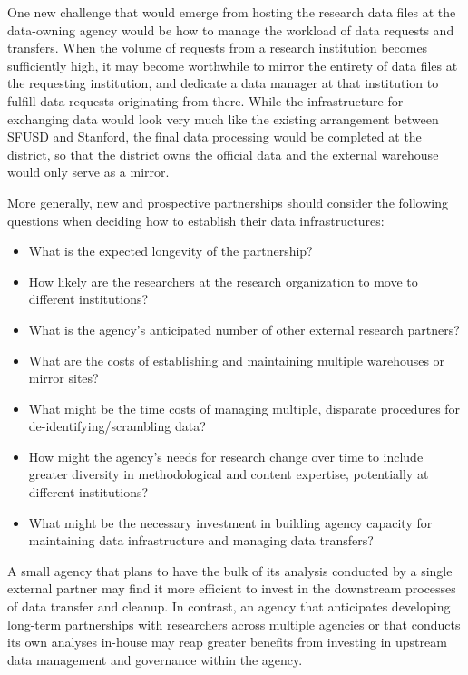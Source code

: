 \documentclass[
]{book}
\providecommand{\tightlist}{%
  \setlength{\itemsep}{0pt}\setlength{\parskip}{0pt}}
\begin{document}
One new challenge that would emerge from hosting the research data files at the data-owning agency would be how to manage the workload of data requests and transfers. When the volume of requests from a research institution becomes sufficiently high, it may become worthwhile to mirror the entirety of data files at the requesting institution, and dedicate a data manager at that institution to fulfill data requests originating from there. While the infrastructure for exchanging data would look very much like the existing arrangement between SFUSD and Stanford, the final data processing would be completed at the district, so that the district owns the official data and the external warehouse would only serve as a mirror.

More generally, new and prospective partnerships should consider the following questions when deciding how to establish their data infrastructures:

\begin{itemize}
\tightlist
\item
  What is the expected longevity of the partnership?
\item
  How likely are the researchers at the research organization to move to different institutions?
\item
  What is the agency's anticipated number of other external research partners?
\item
  What are the costs of establishing and maintaining multiple warehouses or mirror sites?
\item
  What might be the time costs of managing multiple, disparate procedures for de-identifying/scrambling data?
\item
  How might the agency's needs for research change over time to include greater diversity in methodological and content expertise, potentially at different institutions?
\item
  What might be the necessary investment in building agency capacity for maintaining data infrastructure and managing data transfers?
\end{itemize}

A small agency that plans to have the bulk of its analysis conducted by a single external partner may find it more efficient to invest in the downstream processes of data transfer and cleanup. In contrast, an agency that anticipates developing long-term partnerships with researchers across multiple agencies or that conducts its own analyses in-house may reap greater benefits from investing in upstream data management and governance within the agency.
\end{document}
